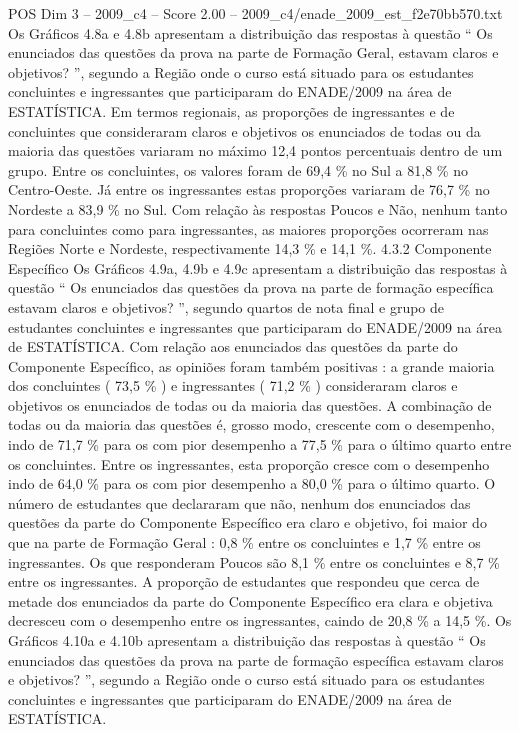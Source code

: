 \begin{textsample}{POS Dim 3 – 2009\_c4 – Score 2.00 – 2009\_c4/enade\_2009\_est\_f2e70bb570.txt}
Os Gráficos 4.8a e 4.8b apresentam a distribuição das respostas à questão “ Os enunciados das questões da prova na parte de Formação Geral, estavam claros e objetivos? ”, segundo a Região onde o curso está situado para os estudantes concluintes e ingressantes que participaram do ENADE/2009 na área de ESTATÍSTICA.
Em termos regionais, as proporções de ingressantes e de concluintes que consideraram claros e objetivos os enunciados de todas ou da maioria das questões variaram no máximo 12,4 pontos percentuais dentro de um grupo.
Entre os concluintes, os valores foram de 69,4 \% no Sul a 81,8 \% no Centro-Oeste.
Já entre os ingressantes estas proporções variaram de 76,7 \% no Nordeste a 83,9 \% no Sul.
Com relação às respostas Poucos e Não, nenhum tanto para concluintes como para ingressantes, as maiores proporções ocorreram nas Regiões Norte e Nordeste, respectivamente 14,3 \% e 14,1 \%. 4.3.2 Componente Específico Os Gráficos 4.9a, 4.9b e 4.9c apresentam a distribuição das respostas à questão “ Os enunciados das questões da prova na parte de formação específica estavam claros e objetivos? ”, segundo quartos de nota final e grupo de estudantes concluintes e ingressantes que participaram do ENADE/2009 na área de ESTATÍSTICA.
Com relação aos enunciados das questões da parte do Componente Específico, as opiniões foram também positivas : a grande maioria dos concluintes ( 73,5 \% ) e ingressantes ( 71,2 \% ) consideraram claros e objetivos os enunciados de todas ou da maioria das questões.
A combinação de todas ou da maioria das questões é, grosso modo, crescente com o desempenho, indo de 71,7 \% para os com pior desempenho a 77,5 \% para o último quarto entre os concluintes.
Entre os ingressantes, esta proporção cresce com o desempenho indo de 64,0 \% para os com pior desempenho a 80,0 \% para o último quarto.
O número de estudantes que declararam que não, nenhum dos enunciados das questões da parte do Componente Específico era claro e objetivo, foi maior do que na parte de Formação Geral : 0,8 \% entre os concluintes e 1,7 \% entre os ingressantes.
Os que responderam Poucos são 8,1 \% entre os concluintes e 8,7 \% entre os ingressantes.
A proporção de estudantes que respondeu que cerca de metade dos enunciados da parte do Componente Específico era clara e objetiva decresceu com o desempenho entre os ingressantes, caindo de 20,8 \% a 14,5 \%.
Os Gráficos 4.10a e 4.10b apresentam a distribuição das respostas à questão “ Os enunciados das questões da prova na parte de formação específica estavam claros e objetivos? ”, segundo a Região onde o curso está situado para os estudantes concluintes e ingressantes que participaram do ENADE/2009 na área de ESTATÍSTICA.

\end{textsample}
